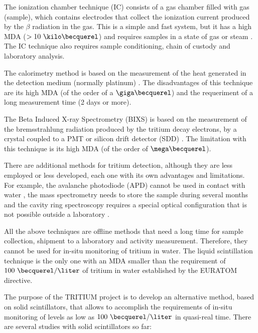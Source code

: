 The ionization chamber technique (IC) consists of a gas chamber filled with gas (sample), which contains electrodes that collect the ionization current produced by the $\beta$ radiation in the gas. This is a simple and fast system, but it has a high MDA ($> 10~\kilo\becquerel$) and requires samples in a state of gas or steam \cite{IonizationChamber1, IonizationChamber2}. The IC technique also requires sample conditioning, chain of custody and laboratory analysis. 

The calorimetry method is based on the measurement of the heat generated in the detection medium (normally platinum) \cite{Calorimeter1, Calorimeter2}. The disadvantages of this technique are its high MDA (of the order of a $\giga\becquerel$) and the requeriment of a long measurement time (2 days or more).

The Beta Induced X-ray Spectrometry (BIXS) is based on the measurement of the bremsstrahlung radiation produced by the tritium decay electrons, by a  crystal coupled to a PMT  \cite{XRays1, XRays2} or silicon drift detector (SDD) \cite{Bremstrahlung}. The limitation with this technique is its high MDA (of the order of $\mega\becquerel$).

There are additional methods for tritium detection, although they are less employed or less developed, each one with its own advantages and limitations. For example, the avalanche photodiode (APD) cannot be used in contact with water \cite{APD},  the mass spectrometry needs to store the sample during several months \cite{Spectrometry} and the cavity ring spectroscopy requires a special optical configuration that is not possible outside a laboratory \cite{Ring}.

All the above techniques are offline methods that need a long time for sample collection, shipment to a laboratory and activity measurement. Therefore, they cannot be used for in-situ monitoring of tritium in water. The liquid scintillation technique is the only one with an MDA smaller than the requirement of $100~\becquerel/\liter$ of tritium in water established by the EURATOM directive. 

The purpose of the TRITIUM project is to develop an alternative method, based on solid scintillators, that allows to accomplish the requirements of in-situ monitoring of levels as low as $100~\becquerel/\liter$ in quasi-real time. There are several studies with solid scintillators so far:


